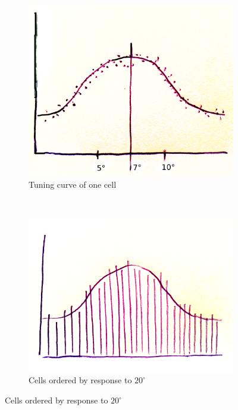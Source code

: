 \documentclass[english,11pt]{article}
\begin{document}
\begin{figure}[H]
        \centering
        \begin{subfigure}[b]{0.3\textwidth}
                \centering
\includegraphics[width=\textwidth]{one-cell-tuning-curve.png}
                \caption{Tuning curve of one cell}
        \end{subfigure}%
        ~
        \begin{subfigure}[b]{0.3\textwidth}
                \centering
\includegraphics[width=\textwidth]{cell-order.png}
                \caption{Cells ordered by response to $20^\circ$}
        \end{subfigure}

\end{figure}
\end{document}
